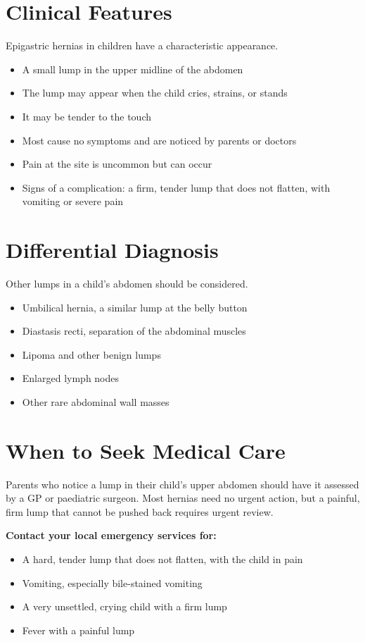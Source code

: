 \section*{Clinical Features}
Epigastric hernias in children have a characteristic appearance.
\begin{itemize}
    \item A small lump in the upper midline of the abdomen
    \item The lump may appear when the child cries, strains, or stands
    \item It may be tender to the touch
    \item Most cause no symptoms and are noticed by parents or doctors
    \item Pain at the site is uncommon but can occur
    \item Signs of a complication: a firm, tender lump that does not flatten, with vomiting or severe pain
\end{itemize}

\section*{Differential Diagnosis}
Other lumps in a child's abdomen should be considered.
\begin{itemize}
    \item Umbilical hernia, a similar lump at the belly button
    \item Diastasis recti, separation of the abdominal muscles
    \item Lipoma and other benign lumps
    \item Enlarged lymph nodes
    \item Other rare abdominal wall masses
\end{itemize}

\section*{When to Seek Medical Care}
Parents who notice a lump in their child's upper abdomen should have it assessed by a GP or paediatric surgeon. Most hernias need no urgent action, but a painful, firm lump that cannot be pushed back requires urgent review.

\textbf{Contact your local emergency services for:}
\begin{itemize}
    \item A hard, tender lump that does not flatten, with the child in pain
    \item Vomiting, especially bile-stained vomiting
    \item A very unsettled, crying child with a firm lump
    \item Fever with a painful lump
\end{itemize}

